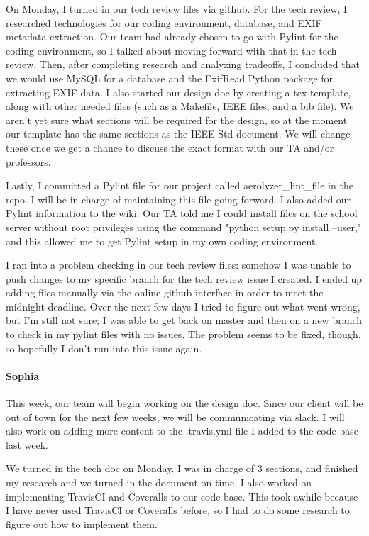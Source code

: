 \documentclass[onecolumn, draftclsnofoot,10pt, compsoc]{IEEEtran}
\begin{document}
\begin{flushleft}
 
On Monday, I turned in our tech review files via github. For the tech review, I researched technologies for our coding environment, database, and EXIF metadata extraction. Our team had already chosen to go with Pylint for the coding environment, so I talked about moving forward with that in the tech review. Then, after completing research and analyzing tradeoffs, I concluded that we would use MySQL for a database and the ExifRead Python package for extracting EXIF data. I also started our design doc by creating a tex template, along with other needed files (such as a Makefile, IEEE files, and a bib file). We aren't yet sure what sections will be required for the design, so at the moment our template has the same sections as the IEEE Std document. We will change these once we get a chance to discuss the exact format with our TA and/or professors.
 
Lastly, I committed a Pylint file for our project called aerolyzer\_lint\_file in the repo. I will be in charge of maintaining this file going forward. I also added our Pylint information to the wiki. Our TA told me I could install files on the school server without root privileges using the command "python setup.py install --user," and this allowed me to get Pylint setup in my own coding environment.
 
 
I ran into a problem checking in our tech review files: somehow I was unable to push changes to my specific branch for the tech review issue I created. I ended up adding files manually via the online github interface in order to meet the midnight deadline. Over the next few days I tried to figure out what went wrong, but I'm still not sure; I was able to get back on master and then on a new branch to check in my pylint files with no issues. The problem seems to be fixed, though, so hopefully I don't run into this issue again.
 
\paragraph{Sophia}
 
This week, our team will begin working on the design doc. Since our client will be out of town for the next few weeks, we will be communicating via slack. I will also work on adding more content to the .travis.yml file I added to the code base last week.
 
 
We turned in the tech doc on Monday. I was in charge of 3 sections, and finished my research and we turned in the document on time. I also worked on implementing TravisCI and Coveralls to our code base. This took awhile because I have never used TravisCI or Coveralls before, so I had to do some research to figure out how to implement them.
 

\end{flushleft}
\end{document}
